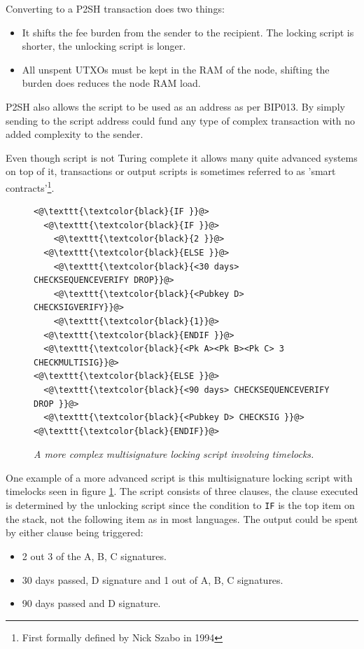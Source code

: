 Converting to a P2SH transaction does two things:

\begin{itemize}

	\item It shifts the fee burden from the sender to the recipient. The locking script is shorter, the unlocking script is longer.
	
	\item All unspent UTXOs must be kept in the RAM of the node, shifting the burden does reduces the node RAM load. 
	
\end{itemize}

P2SH also allows the script to be used as an address as per BIP013\cite{bip:0013:p2shaddr}. By simply sending to the script address could fund any type of complex transaction with no added complexity to the sender.

Even though script is not Turing complete it allows many quite advanced systems on top of it, transactions or output scripts is sometimes referred to as 'smart contracts'\footnote{First formally defined by Nick Szabo in 1994\cite{szabo:smart:contracts}}.

\begin{figure}[hbt!]
	
	\begin{lstlisting}	
<@\texttt{\textcolor{black}{IF }}@>
  <@\texttt{\textcolor{black}{IF }}@>
    <@\texttt{\textcolor{black}{2 }}@>
  <@\texttt{\textcolor{black}{ELSE }}@>
    <@\texttt{\textcolor{black}{<30 days> CHECKSEQUENCEVERIFY DROP}}@>
    <@\texttt{\textcolor{black}{<Pubkey D> CHECKSIGVERIFY}}@>
    <@\texttt{\textcolor{black}{1}}@>
  <@\texttt{\textcolor{black}{ENDIF }}@>
  <@\texttt{\textcolor{black}{<Pk A><Pk B><Pk C> 3 CHECKMULTISIG}}@>
<@\texttt{\textcolor{black}{ELSE }}@>
  <@\texttt{\textcolor{black}{<90 days> CHECKSEQUENCEVERIFY DROP }}@>
  <@\texttt{\textcolor{black}{<Pubkey D> CHECKSIG }}@>
<@\texttt{\textcolor{black}{ENDIF}}@>

	\end{lstlisting}
	
	\caption{\textit{ A more complex multisignature locking script involving timelocks.
	}}
	\label{fig:aantop:multi}
\end{figure}

One example of a more advanced script is this multisignature locking script with timelocks seen in figure \ref{fig:aantop:multi}. The script consists of three clauses, the clause executed is determined by the unlocking script since the condition to \texttt{IF} is the top item on the stack, not the following item as in most languages. The output could be spent by either clause being triggered:
\begin{itemize}
	\item 2 out 3 of the A, B, C signatures.
	\item 30 days passed, D signature and 1 out of A, B, C signatures.
	\item 90 days passed and D signature.
\end{itemize}

